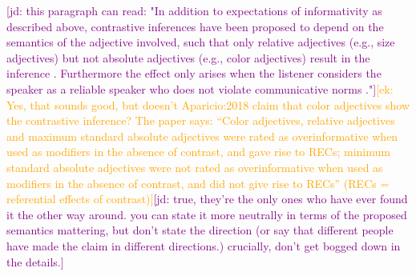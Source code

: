 \documentclass[10pt,letterpaper]{article}
\newcommand{\ek}[1]{\textcolor{Orange}{[ek: #1]}}
\newcommand{\jd}[1]{\textcolor{Purple}{[jd: #1]}}
\begin{document}
\jd{this paragraph can read: "In addition to expectations of informativity as described above, contrastive inferences have been proposed to depend on the semantics of the adjective involved, such that only relative adjectives (e.g., size adjectives) but not absolute adjectives (e.g., color adjectives) result in the inference \cite{Aparicio:2018}. Furthermore the effect only arises when the listener considers the speaker as a reliable speaker who does not violate communicative norms \cite{Grodner:2011,Ryskin:2019}."}\ek{Yes, that sounds good, but doesn't Aparicio:2018 claim that color adjectives show the contrastive inference? The paper says: ``Color adjectives, relative adjectives and maximum standard absolute adjectives were rated as overinformative when used as modifiers in the absence of contrast, and gave rise to RECs; minimum standard absolute adjectives were not rated as overinformative when used as modifiers in the absence of contrast, and did
not give rise to RECs'' (RECs = referential effects of contrast)}\jd{true, they're the only ones who have ever found it the other way around. you can state it more neutrally in terms of the proposed semantics mattering, but don't state the direction (or say that different people have made the claim in different directions.) crucially, don't get bogged down in the details.}
\end{document}
